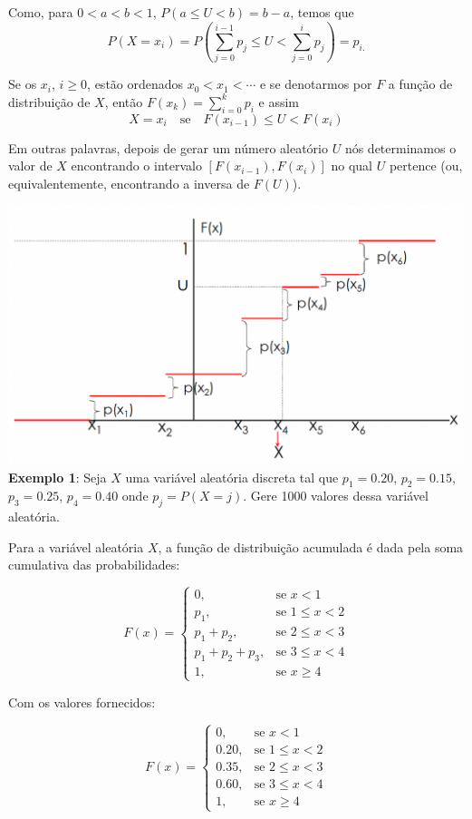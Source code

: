 \documentclass[
]{book}
\begin{document}
Como, para \(0<a<b<1\), \(P(a\leq U<b)=b-a\), temos que
\[P(X=x_{i}) = P\left( \sum_{j=0}^{i-1}p_{j} \leq U < \sum_{j=0}^{i}p_{j} \right) = p_{i.}\]

Se os \(x_{i}\), \(i\geq 0\), estão ordenados \(x_{0}<x_{1}<\cdots\) e se
denotarmos por \(F\) a função de distribuição de \(X\), então
\(F(x_{k})=\sum_{i=0}^{k}p_{i}\) e assim
\[X = x_{i} \quad \text{se} \quad F(x_{i-1})\leq U < F(x_{i})\]

Em outras palavras, depois de gerar um número aleatório \(U\) nós
determinamos o valor de \(X\) encontrando o intervalo
\([F(x_{i-1}),F(x_{i})]\) no qual \(U\) pertence (ou, equivalentemente,
encontrando a inversa de \(F(U)\)).

\includegraphics{docs/transf_inversa1.png} \textbf{Exemplo 1}: Seja \(X\) uma variável
aleatória discreta tal que \(p_{1}=0.20\), \(p_{2}=0.15\), \(p_{3}=0.25\),
\(p_{4}=0.40\) onde \(p_{j}=P(X=j)\). Gere 1000 valores dessa variável
aleatória.

Para a variável aleatória \(X\), a função de distribuição acumulada é dada
pela soma cumulativa das probabilidades:

\[
F(x) = 
\begin{cases} 
0, & \text{se } x < 1 \\
p_1, & \text{se } 1 \leq x < 2 \\
p_1 + p_2, & \text{se } 2 \leq x < 3 \\
p_1 + p_2 + p_3, & \text{se } 3 \leq x < 4 \\
1, & \text{se } x \geq 4 
\end{cases}
\]

Com os valores fornecidos:

\[
F(x) = 
\begin{cases} 
0, & \text{se } x < 1 \\
0.20, & \text{se } 1 \leq x < 2 \\
0.35, & \text{se } 2 \leq x < 3 \\
0.60, & \text{se } 3 \leq x < 4 \\
1, & \text{se } x \geq 4 
\end{cases}
\]
\end{document}
